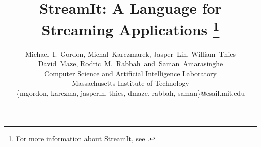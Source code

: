 \documentclass[10pt,twocolumn]{article}
\begin{document}
\title{StreamIt: A Language for Streaming Applications%
\thanks{For more information about StreamIt, see \streamiturl.}}

\author{Michael~I.~Gordon, Michal~Karczmarek, Jasper~Lin, William~Thies\\
  David~Maze, Rodric~M.~Rabbah~and~Saman~Amarasinghe\\
  Computer Science and Artificial Intelligence Laboratory\\
  Massachusetts Institute of Technology\\
  \{mgordon, karczma, jasperln, thies, dmaze, rabbah, saman\}@csail.mit.edu}

\maketitle

\newcommand{\makeline}[0]{\rule{0cm}{0cm}\\\hrule\rule{0cm}{0cm}}


\thispagestyle{empty}

\begin{abstract}

\end{abstract}







%
%
%









%
\end{document}
